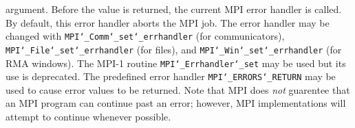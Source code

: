 argument.  Before the value is returned, the current MPI error handler is
called.  By default, this error handler aborts the MPI job.  The error handler
may be changed with {\tt MPI{\tt \char`\_}Comm{\tt \char`\_}set{\tt \char`\_}errhandler} (for communicators),
{\tt MPI{\tt \char`\_}File{\tt \char`\_}set{\tt \char`\_}errhandler} (for files), and {\tt MPI{\tt \char`\_}Win{\tt \char`\_}set{\tt \char`\_}errhandler} (for
RMA windows).  The MPI-1 routine {\tt MPI{\tt \char`\_}Errhandler{\tt \char`\_}set} may be used but
its use is deprecated.  The predefined error handler
{\tt MPI{\tt \char`\_}ERRORS{\tt \char`\_}RETURN} may be used to cause error values to be returned.
Note that MPI does {\em not} guarentee that an MPI program can continue past
an error; however, MPI implementations will attempt to continue whenever
possible.
\par
{}
\endmanpage
